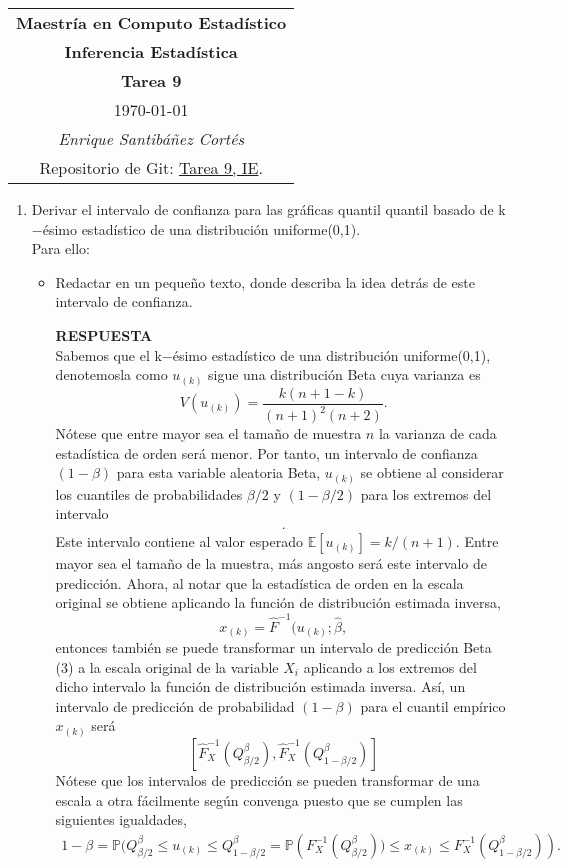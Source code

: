 \documentclass[11pt,letterpaper]{article}
\newcommand{\mP}{\mathbb{P}}
\newcommand{\mE}{\mathbb{E}}
\newcommand{\res}{\textbf{RESPUESTA}\\}
\begin{document}
\begin{table}[ht]
\centering
\begin{tabular}{c}
\textbf{Maestría en Computo Estadístico}\\
\textbf{Inferencia Estadística} \\
\textbf{Tarea 9}\\
\today \\
\emph{Enrique Santibáñez Cortés}\\
Repositorio de Git: \href{https://github.com/Enriquesec/Inferencia_Estad-stica/tree/master/Tareas/Tarea_9}{Tarea 9, IE}.
\end{tabular}
\end{table}

\begin{enumerate}



\item Derivar el intervalo de confianza para las gráficas quantil quantil basado de k$-$ésimo estadístico de una distribución uniforme(0,1).\\

Para ello:
\begin{itemize}
\item Redactar en un pequeño texto, donde describa la idea detrás de este intervalo de confianza.

\res Sabemos que el k$-$ésimo estadístico de una distribución uniforme(0,1), denotemosla como $u_{(k)}$ sigue una distribución Beta cuya varianza es
$$V(u_{(k)})=\frac{k(n+1-k)}{(n+1)^2(n+2)}.$$
Nótese que entre mayor sea el tamaño de muestra $n$ la varianza de cada estadística de orden será menor. Por tanto, un intervalo de confianza $(1-\beta)$ para esta variable aleatoria Beta, $u_{(k)}$ se obtiene
al considerar los cuantiles de probabilidades $\beta/2$ y $(1- \beta/2)$ para los extremos del intervalo
\begin{align*}
[Q^B_{\beta/2}, Q_{1-\beta/2}^B].
\end{align*}
Este intervalo contiene al valor esperado $\mE[u_{(k)}]=k/(n+1)$. Entre mayor sea el tamaño de la muestra, más angosto será este intervalo de predicción. Ahora, al notar que la estadística de orden en la escala original se obtiene aplicando la función de distribución
estimada inversa, $$x_{(k)}=\hat{F}^{-1}(u_{(k)};\hat{\beta},$$
entonces también se puede transformar un intervalo de predicción Beta (3) a la escala original de la variable $X_i$
aplicando a los extremos del dicho intervalo la función de distribución estimada inversa. Así, un intervalo de predicción de probabilidad $(1 - \beta)$ para el cuantil empírico $x_{(k)}$ será
$$[\hat{F}_X^{-1}(Q_{\beta/2}^\beta), \hat{F}_X^{-1}(Q_{1-\beta/2}^\beta)]$$
Nótese que los intervalos de predicción se pueden transformar de una escala a otra fácilmente según convenga puesto que se cumplen las siguientes igualdades,
\begin{align*}
1-\beta = \mP(Q_{\beta/2}^\beta\leq u_{(k)} \leq Q_{1-\beta/2}^\beta = \mP\left(F_X^{-1}(Q_{\beta/2}^\beta))\leq x_{(k)} \leq F_X^{-1}(Q_{1-\beta/2}^\beta)\right).
\end{align*}




\end{itemize}
\end{enumerate}
\end{document}
